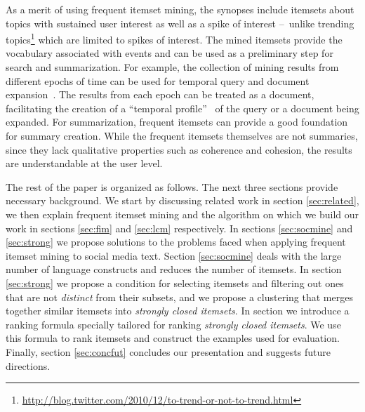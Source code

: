 \documentclass{sig-alternate}
\begin{document}


As a merit of using frequent itemset mining, the synopses include
itemsets about topics with sustained user interest as well as a spike of interest
--~unlike trending topics\footnote{\scriptsize \url{http://blog.twitter.com/2010/12/to-trend-or-not-to-trend.html}}
\cite{mathioudakis2010twittermonitor} which are limited to spikes of interest.
The mined itemsets provide the vocabulary associated with events and can be
used as a preliminary step for search and summarization.
For example, the collection of mining results from different epochs of time
can be used for temporal query and document
expansion~\cite{choi2012temporal, efron2012improving}.
The results from each epoch can be treated as a document, facilitating the
creation of a ``temporal profile''~\cite{jones2007temporal} of the query
or a document being expanded.
For summarization, frequent itemsets can provide a good foundation for summary
creation.
While the frequent itemsets themselves are not summaries, since they lack
qualitative properties such as coherence and cohesion, the results are
understandable at the user level.

The rest of the paper is organized as follows.
The next three sections provide necessary background.
We start by discussing related work in section \ref{sec:related},
we then explain frequent itemset mining and the algorithm on which we build
our work in sections \ref{sec:fim} and \ref{sec:lcm} respectively.
In sections \ref{sec:socmine} and \ref{sec:strong} we
propose solutions to the problems faced when applying frequent
itemset mining to social media text. 
Section \ref{sec:socmine} deals with the large number of language
constructs and reduces the number of itemsets.
In section  \ref{sec:strong} we propose a condition for selecting
itemsets and filtering out ones that are not \emph{distinct} from 
their subsets, and we propose a clustering that merges
together similar itemsets into \emph{strongly closed itemsets}.
In section \label{sec:rank} we introduce a ranking formula
specially tailored for ranking \emph{strongly closed itemsets}.
We use this formula to rank itemsets and construct 
the examples used for evaluation. %
Finally, section \ref{sec:concfut} concludes our presentation and
suggests future directions.
\end{document}
